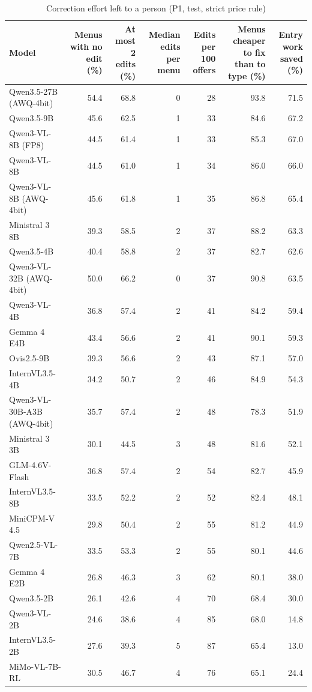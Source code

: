 \begin{table}[t]
\centering
\caption{Correction effort left to a person (P1, test, strict price rule)}
\label{tab:effort}
\small
\begin{tabular}{lrrrrrr}
\toprule
Model & Menus with no edit (\%) & At most 2 edits (\%) & Median edits per menu & Edits per 100 offers & Menus cheaper to fix than to type (\%) & Entry work saved (\%) \\
\midrule
Qwen3.5-27B (AWQ-4bit) & 54.4 & 68.8 & 0 & 28 & 93.8 & 71.5 \\
Qwen3.5-9B & 45.6 & 62.5 & 1 & 33 & 84.6 & 67.2 \\
Qwen3-VL-8B (FP8) & 44.5 & 61.4 & 1 & 33 & 85.3 & 67.0 \\
Qwen3-VL-8B & 44.5 & 61.0 & 1 & 34 & 86.0 & 66.0 \\
Qwen3-VL-8B (AWQ-4bit) & 45.6 & 61.8 & 1 & 35 & 86.8 & 65.4 \\
Ministral 3 8B & 39.3 & 58.5 & 2 & 37 & 88.2 & 63.3 \\
Qwen3.5-4B & 40.4 & 58.8 & 2 & 37 & 82.7 & 62.6 \\
Qwen3-VL-32B (AWQ-4bit) & 50.0 & 66.2 & 0 & 37 & 90.8 & 63.5 \\
Qwen3-VL-4B & 36.8 & 57.4 & 2 & 41 & 84.2 & 59.4 \\
Gemma 4 E4B & 43.4 & 56.6 & 2 & 41 & 90.1 & 59.3 \\
Ovis2.5-9B & 39.3 & 56.6 & 2 & 43 & 87.1 & 57.0 \\
InternVL3.5-4B & 34.2 & 50.7 & 2 & 46 & 84.9 & 54.3 \\
Qwen3-VL-30B-A3B (AWQ-4bit) & 35.7 & 57.4 & 2 & 48 & 78.3 & 51.9 \\
Ministral 3 3B & 30.1 & 44.5 & 3 & 48 & 81.6 & 52.1 \\
GLM-4.6V-Flash & 36.8 & 57.4 & 2 & 54 & 82.7 & 45.9 \\
InternVL3.5-8B & 33.5 & 52.2 & 2 & 52 & 82.4 & 48.1 \\
MiniCPM-V 4.5 & 29.8 & 50.4 & 2 & 55 & 81.2 & 44.9 \\
Qwen2.5-VL-7B & 33.5 & 53.3 & 2 & 55 & 80.1 & 44.6 \\
Gemma 4 E2B & 26.8 & 46.3 & 3 & 62 & 80.1 & 38.0 \\
Qwen3.5-2B & 26.1 & 42.6 & 4 & 70 & 68.4 & 30.0 \\
Qwen3-VL-2B & 24.6 & 38.6 & 4 & 85 & 68.0 & 14.8 \\
InternVL3.5-2B & 27.6 & 39.3 & 5 & 87 & 65.4 & 13.0 \\
MiMo-VL-7B-RL & 30.5 & 46.7 & 4 & 76 & 65.1 & 24.4 \\

\end{tabular}
\end{table}
